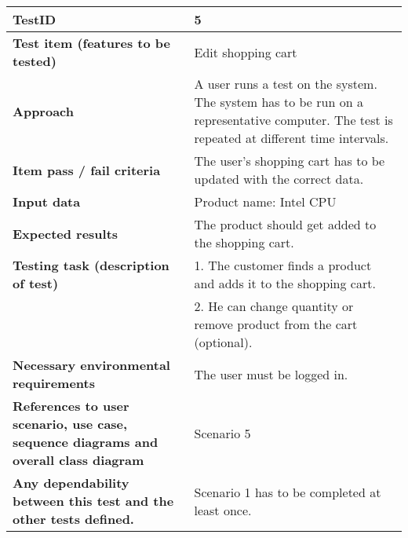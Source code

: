 \begin{table}
    \centering
	\begin{tabularx}{1.2\textwidth}{| p{5cm} | X |}
	\hline
	\textbf{TestID} 																& 5\\ \hline
	\textbf{Test item (features to be tested)} 											& Edit shopping cart\\ \hline
	\textbf{Approach} 															& A user runs a test on the system. The system has to be run on a representative computer. 
																			The test is repeated at different time intervals.\\ \hline
	\textbf{Item pass / fail criteria} 													& The user's shopping cart has to be updated with the correct data.\\ \hline
	\textbf{Input data} 															& Product name: Intel CPU\\ \hline
	\textbf{Expected results}									 					& The product should get added to the shopping cart.\\ \hline
	\textbf{Testing task (description of test)} 											& 1. The customer finds a product and adds it to the shopping cart. \\
																			& 2. He can change quantity or remove product from the cart (optional). \\ \hline
	\textbf{Necessary environmental requirements} 										& The user must be logged in.\\ \hline
	\textbf{References to user scenario, use case, sequence diagrams and overall class diagram} 		& Scenario 5\\ \hline
	\textbf{Any dependability between this test and the other tests defined.}		 				& Scenario 1 has to be completed at least once.\\ \hline
	\end{tabularx}
\end{table}


